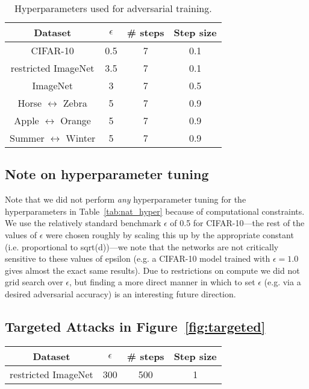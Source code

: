 \documentclass{article}
\newcommand{\HtoZ}{Horse $\leftrightarrow$ Zebra}
\newcommand{\StoW}{Summer $\leftrightarrow$ Winter}
\newcommand{\AtoO}{Apple $\leftrightarrow$ Orange}
\begin{document}
{\begin{table}[!h]
	\caption{Hyperparameters used for adversarial training.}
\begin{center}
\setlength{\tabcolsep}{.8cm}
\begin{tabular}{cccc}
\toprule 
Dataset & $\epsilon$ & \# steps & Step size \\
\midrule
CIFAR-10 & 0.5 & 7 & 0.1 \\
restricted ImageNet & 3.5 & 7 & 0.1 \\
ImageNet & 3 & 7 & 0.5 \\
{\HtoZ} & 5 & 7 & 0.9 \\
{\AtoO} & 5 & 7 & 0.9 \\
{\StoW} & 5 & 7 & 0.9 \\
\bottomrule 
\end{tabular}
\end{center}
	\label{tab:adv_hyper}
\end{table}


\subsection{Note on hyperparameter tuning}
\label{app:tune}
Note that we did not perform \emph{any} hyperparameter tuning 
for the hyperparameters in Table~\ref{tab:nat_hyper} because of 
computational constraints. We use the relatively standard benchmark 
$\epsilon$ of 0.5 for CIFAR-10---the rest of the values of $\epsilon$ were chosen 
roughly by scaling this up by the appropriate constant (i.e. proportional
to sqrt(d))---we note that the networks are not critically sensitive to 
these values of epsilon (e.g. a CIFAR-10 model trained with $\epsilon=1.0$ 
gives almost the exact same results). Due to restrictions on compute we 
did not grid search over $\epsilon$, but finding a more direct manner 
in which to set $\epsilon$ (e.g. via a desired adversarial accuracy) is an 
interesting future direction.

\subsection{Targeted Attacks in Figure~\ref{fig:targeted}}

\begin{center}
\setlength{\tabcolsep}{.8cm}
\begin{tabular}{cccc}
\toprule 
Dataset & $\epsilon$ & \# steps & Step size \\
\midrule
restricted ImageNet & 300 & 500 & 1 \\
\bottomrule 
\end{tabular}
\end{center}

}
\end{document}
